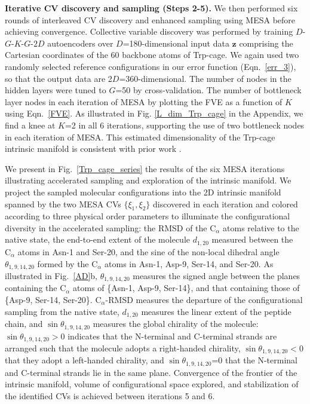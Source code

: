 \documentclass[12pt]{article}
\newcommand*{\blauw}[1]{#1}
\begin{document}
\textbf{Iterative CV discovery and sampling (Steps 2-5).} We then performed six rounds of interleaved CV discovery and enhanced sampling using MESA before achieving convergence. Collective variable discovery was performed by training $D$-$G$-$K$-$G$-$2D$ autoencoders over $D$=180-dimensional input data $\textbf{z}$ comprising the Cartesian coordinates of the 60 backbone atoms of Trp-cage. We again used two randomly selected reference configurations in our error function (\blauw{Eqn.~\ref{err_3}}), so that the output data are 2$D$=360-dimensional. The number of nodes in the hidden layers were tuned to $G$=50 by cross-validation. The number of bottleneck layer nodes in each iteration of MESA by plotting the FVE as a function of $K$ using \blauw{Eqn.~\ref{FVE}}. As illustrated in \blauw{Fig. \ref{L_dim_Trp_cage}} in the \blauw{Appendix}, we find a knee at $K$=2 in all 6 iterations, supporting the use of two bottleneck nodes in each iteration of MESA. This estimated dimensionality of the Trp-cage intrinsic manifold is consistent with prior work \cite{juraszek2006sampling,kim2015systematic,zhou2003trp}. 

We present in \blauw{Fig.~\ref{Trp_cage_series}} the results of the six MESA iterations illustrating accelerated sampling and exploration of the intrinsic manifold. We project the sampled molecular configurations into the 2D intrinsic manifold spanned by the two MESA CVs $\{\xi_1,\xi_2\}$ discovered in each iteration and colored according to three physical order parameters to illuminate the configurational diversity in the accelerated sampling: the RMSD of the $\mathrm{C}_\alpha$ atoms relative to the native state, the end-to-end extent of the molecule $d_{1,20}$ measured between the $\mathrm{C}_\alpha$ atoms in Asn-1 and Ser-20, and the sine of the non-local dihedral angle $\theta_{1,9,14,20}$ formed by the $\mathrm{C}_\alpha$ atoms in Asn-1, Asp-9, Ser-14, and Ser-20. As illustrated in \blauw{Fig.~\ref{AD}b}, $\theta_{1,9,14,20}$ measures the signed angle between the planes containing the $\mathrm{C}_\alpha$ atoms of \{Asn-1, Asp-9, Ser-14\}, and that containing those of \{Asp-9, Ser-14, Ser-20\}. $\mathrm{C}_\alpha$-RMSD measures the departure of the configurational sampling from the native state, $d_{1,20}$ measures the linear extent of the peptide chain, and $\sin \theta_{1,9,14,20}$ measures the global chirality of the molecule: $\sin \theta_{1,9,14,20}>0$ indicates that the N-terminal and C-terminal strands are arranged such that the molecule adopts a right-handed chirality, $\sin \theta_{1,9,14,20}<0$ that they adopt a left-handed chirality, and $\sin \theta_{1,9,14,20}$=0 that the N-terminal and C-terminal strands lie in the same plane. Convergence of the frontier of the intrinsic manifold, volume of configurational space explored, and stabilization of the identified CVs is achieved between iterations 5 and 6.
\end{document}
